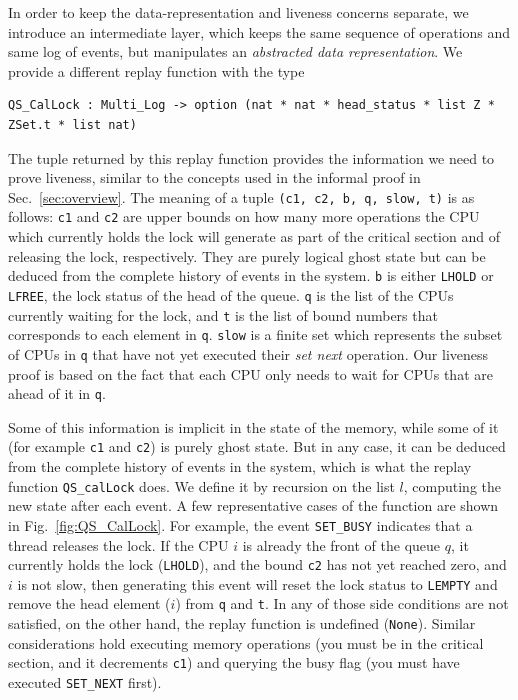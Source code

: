 In order to keep the data-representation and liveness concerns separate,
we introduce an intermediate layer, which keeps the same sequence of operations and same log of events, 
but manipulates an \emph{abstracted data representation}.
We provide a different replay function with the type 

\begin{lstlisting}
QS_CalLock : Multi_Log -> option (nat * nat * head_status * list Z * ZSet.t * list nat)
\end{lstlisting}

The tuple returned by this replay function provides the information we
need to prove liveness, 
similar to the concepts used in the informal
proof in Sec.~\ref{sec:overview}. 
The meaning of a tuple
\lstinline$(c1, c2, b, q, slow, t)$ is as follows:
\lstinline$c1$ and \lstinline$c2$ are upper bounds on how many more operations 
the CPU which currently holds the lock will generate as part of the critical section and of 
releasing the lock, respectively. 
They are purely logical ghost state but can be deduced from the complete
history of events in the system.
\lstinline$b$ is either  \lstinline$LHOLD$ or \lstinline$LFREE$, 
the lock status of the head of the queue.
\lstinline$q$ is the list of the CPUs currently waiting for the lock, 
and \lstinline$t$ is the list of bound numbers that 
corresponds to each element in \lstinline$q$.
\lstinline$slow$ is a finite set which represents the subset of CPUs in \lstinline$q$ that have not yet executed their \emph{set next} operation.  
Our liveness proof is based on the fact that each CPU only needs to wait for CPUs that are ahead of it in \lstinline$q$.

Some of this information is implicit in the state of the memory, while some of it (for example \lstinline$c1$ and \lstinline$c2$) is purely ghost state. But in any case, it can be deduced from the complete history of events in the system, which is what the replay function \lstinline$QS_calLock$ does. We define it by recursion on the list $l$, computing the new state after each event. A few representative cases of the function are shown in Fig.~\ref{fig:QS_CalLock}.  For example, the event \lstinline$SET_BUSY$ indicates that a thread releases the lock. If the CPU $i$ is already the  front of the queue $q$, it currently holds the lock (\lstinline$LHOLD$), and the bound \lstinline$c2$ has not yet reached zero, and $i$ is not slow, then generating this event will reset the lock status to \lstinline$LEMPTY$ and remove the head element ($i$) from \lstinline$q$ and \lstinline$t$. In any of those side conditions are not satisfied, on the other hand, the replay function is undefined (\lstinline$None$). Similar considerations hold executing memory operations (you must be in the critical section, and it decrements \lstinline$c1$) and querying the busy flag (you must have executed \lstinline$SET_NEXT$ first).

